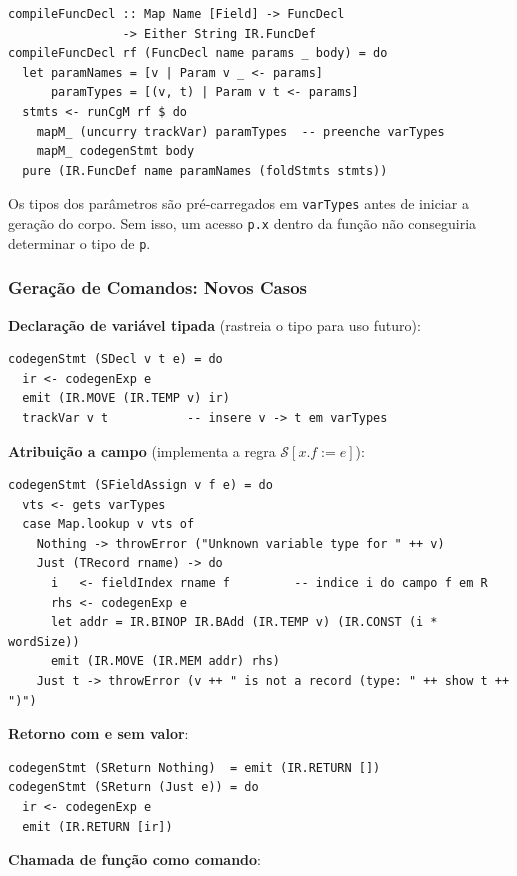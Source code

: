 \begin{verbatim}
compileFuncDecl :: Map Name [Field] -> FuncDecl
                -> Either String IR.FuncDef
compileFuncDecl rf (FuncDecl name params _ body) = do
  let paramNames = [v | Param v _ <- params]
      paramTypes = [(v, t) | Param v t <- params]
  stmts <- runCgM rf $ do
    mapM_ (uncurry trackVar) paramTypes  -- preenche varTypes
    mapM_ codegenStmt body
  pure (IR.FuncDef name paramNames (foldStmts stmts))
\end{verbatim}

Os tipos dos parâmetros são pré-carregados em \texttt{varTypes} antes de
iniciar a geração do corpo. Sem isso, um acesso \texttt{p.x} dentro da
função não conseguiria determinar o tipo de \texttt{p}.

\subsubsection*{Geração de Comandos: Novos Casos}

\textbf{Declaração de variável tipada} (rastreia o tipo para uso futuro):

\begin{verbatim}
codegenStmt (SDecl v t e) = do
  ir <- codegenExp e
  emit (IR.MOVE (IR.TEMP v) ir)
  trackVar v t           -- insere v -> t em varTypes
\end{verbatim}

\textbf{Atribuição a campo} (implementa a regra $\mathcal{S}[x.f:=e]$):

\begin{verbatim}
codegenStmt (SFieldAssign v f e) = do
  vts <- gets varTypes
  case Map.lookup v vts of
    Nothing -> throwError ("Unknown variable type for " ++ v)
    Just (TRecord rname) -> do
      i   <- fieldIndex rname f         -- indice i do campo f em R
      rhs <- codegenExp e
      let addr = IR.BINOP IR.BAdd (IR.TEMP v) (IR.CONST (i * wordSize))
      emit (IR.MOVE (IR.MEM addr) rhs)
    Just t -> throwError (v ++ " is not a record (type: " ++ show t ++ ")")
\end{verbatim}

\textbf{Retorno com e sem valor}:

\begin{verbatim}
codegenStmt (SReturn Nothing)  = emit (IR.RETURN [])
codegenStmt (SReturn (Just e)) = do
  ir <- codegenExp e
  emit (IR.RETURN [ir])
\end{verbatim}

\textbf{Chamada de função como comando}:

